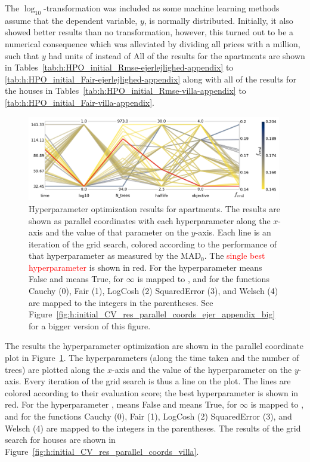 The $\log_{10}$-transformation was included as some machine learning methods assume that the dependent variable, $y$, is normally distributed. Initially, it also showed better results than no transformation, however, this turned out to be a numerical consequence which was alleviated by dividing all prices with a million, such that $y$ had units of \si{\Mkr} instead of \si{\kr} All of the results for the apartments are shown in Tables~\ref{tab:h:HPO_initial_Rmse-ejerlejlighed-appendix} to \ref{tab:h:HPO_initial_Fair-ejerlejlighed-appendix} along with all of the results for the houses in Tables~\ref{tab:h:HPO_initial_Rmse-villa-appendix} to \ref{tab:h:HPO_initial_Fair-villa-appendix}. 

\begin{figure}[h!]
  \centerfloat
  \includegraphics[width=0.99\textwidth, trim=0 0 0 0, clip]{figures/housing/Ejerlejlighed_v19_cut_all_Ncols_all_CV_viz_initial_HPO.pdf}
  \caption[Parallel Coordinate Plot of the Initial Hyperparameter Optimization for Apartments]
          {Hyperparameter optimization results for apartments. The results are shown as parallel coordinates with each hyperparameter along the $x$-axis and the value of that parameter on the $y$-axis. Each line is an iteration of the grid search, colored according to the performance of that hyperparameter as measured by the $\mathrm{MAD}_0$. The \textcolor{red}{single best hyperparameter} is shown in red. For the hyperparameter   means False and  means True, for  $\infty$ is mapped to , and for  the functions Cauchy (0), Fair (1), LogCosh (2) SquaredError (3), and Welsch (4) are mapped to the integers in the parentheses. See Figure~\ref{fig:h:initial_CV_res_parallel_coords_ejer_appendix_big} for a bigger version of this figure.} 
  \label{fig:h:initial_CV_res_parallel_coords_ejer}
\end{figure}

The results the hyperparameter optimization are shown in the parallel coordinate plot in Figure~\ref{fig:h:initial_CV_res_parallel_coords_ejer}. The hyperparameters (along the time taken and the number of trees) are plotted along the $x$-axis and the value of the hyperparameter on the $y$-axis. Every iteration of the grid search is thus a line on the plot. The lines are colored according to their evaluation score; the best hyperparameter is shown in red. For the hyperparameter ,  means False and  means True, for  $\infty$ is mapped to , and for  the functions Cauchy (0), Fair (1), LogCosh (2) SquaredError (3), and Welsch (4) are mapped to the integers in the parentheses. The results of the grid search for houses are shown in Figure~\ref{fig:h:initial_CV_res_parallel_coords_villa}.


